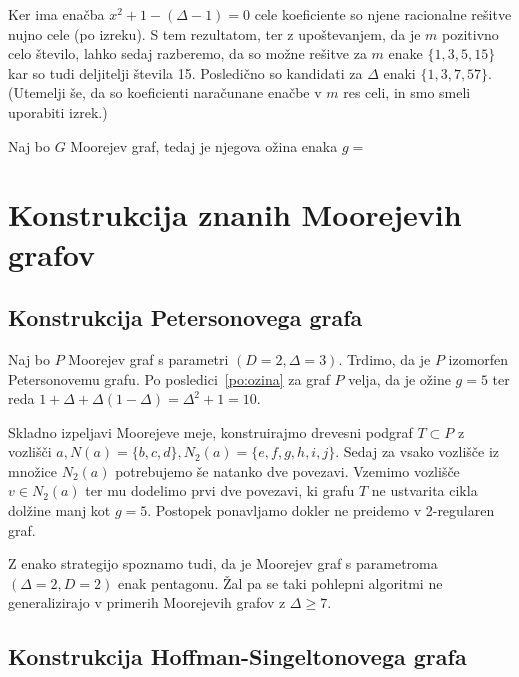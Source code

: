 \documentclass[fin1, tisk]{fmfdelo}
\begin{document}
Ker ima enačba $x^2 + 1 - (\Delta - 1) = 0$ cele koeficiente so njene 
racionalne rešitve nujno cele (po izreku).
S tem rezultatom, ter z upoštevanjem, da je $m$ pozitivno celo število, 
lahko sedaj razberemo, da so možne rešitve za $m$ enake 
$\{1, 3, 5, 15\}$ kar so tudi deljitelji števila 15. Posledično 
so kandidati za $\Delta$ enaki $\{1, 3, 7, 57\}$. (Utemelji še, da
so koeficienti naračunane enačbe v $m$ res celi, in smo smeli 
uporabiti izrek.)

\begin{izrek}
Naj bo $G$ Moorejev graf, tedaj je njegova ožina enaka $g=$
\end{izrek}


\section{Konstrukcija znanih Moorejevih grafov}

\subsection{Konstrukcija Petersonovega grafa}

Naj bo $P$ Moorejev graf s parametri $(D=2, \Delta=3)$. Trdimo,
da je $P$ izomorfen Petersonovemu grafu. Po posledici~\ref{po:ozina} 
za graf $P$ velja, da je ožine $g=5$ ter reda 
$1 + \Delta + \Delta (1 - \Delta)=\Delta^2 + 1=10$.

Skladno izpeljavi Moorejeve meje, konstruirajmo drevesni podgraf $T \subset P$
z vozlišči $a, N(a)=\{b, c, d\}, N_2(a)=\{e, f, g, h, i, j\}$. Sedaj za vsako 
vozlišče iz množice $N_2(a)$ potrebujemo še natanko dve povezavi. Vzemimo vozlišče 
$v \in N_2(a)$ ter mu dodelimo prvi dve povezavi, ki grafu $T$ ne ustvarita cikla 
dolžine manj kot $g=5$. Postopek ponavljamo dokler ne preidemo v 2-regularen graf.

Z enako strategijo spoznamo tudi, da je Moorejev graf s parametroma $(\Delta=2, D=2)$
enak pentagonu. Žal pa se taki pohlepni algoritmi ne generalizirajo v primerih Moorejevih 
grafov z $\Delta \geq 7$.

\subsection{Konstrukcija Hoffman-Singeltonovega grafa}
\end{document}
